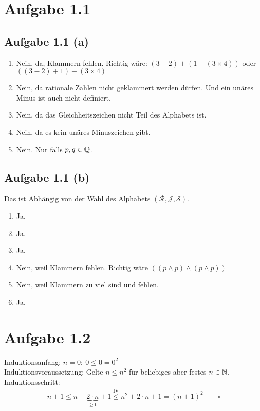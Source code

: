 \documentclass[12pt,a4paper]{article}
\author{Willi Sontopski}
\begin{document}

\section*{Aufgabe 1.1}
\subsection*{Aufgabe 1.1 (a)}
\begin{enumerate}[label=(\arabic*)]
\item  Nein, da, Klammern fehlen. Richtig wäre: $(3-2)+(1-(3\times 4))$ oder $((3-2)+1)-(3\times 4)$
\item Nein, da rationale Zahlen nicht geklammert werden dürfen. Und ein unäres Minus ist auch nicht definiert.
\item Nein, da das Gleichheitszeichen nicht Teil des Alphabets ist.
\item Nein, da es kein unäres Minuszeichen gibt.
\item Nein. Nur falls $p,q\in\mathbb{Q}$.
\end{enumerate}

\subsection*{Aufgabe 1.1 (b)}
Das ist Abhängig von der Wahl des Alphabets $(\mathcal{R},\mathcal{J},\mathcal{S})$.
\begin{enumerate}[label=(\arabic*)]
\item Ja.
\item Ja.
\item Ja.
\item Nein, weil Klammern fehlen. Richtig wäre $((p\wedge p)\wedge(p\wedge p))$
\item Nein, weil Klammern zu viel sind und fehlen.
\item Ja.
\end{enumerate}

\section*{Aufgabe 1.2}
Induktionsanfang: $n=0:~0\leq0=0^2$\\
Induktionsvoraussetzung: Gelte $n\leq n^2$ für beliebiges aber festes $n\in\mathbb{N}$.\\
Induktionsschritt: 
\begin{align*}
n+1\leq
n+\underbrace{2\cdot n}_{\geq0}+1
\stackrel{\text{IV}}{\leq} n^2+2\cdot n+1=(n+1)^2\qquad\square
\end{align*}
\end{document}
